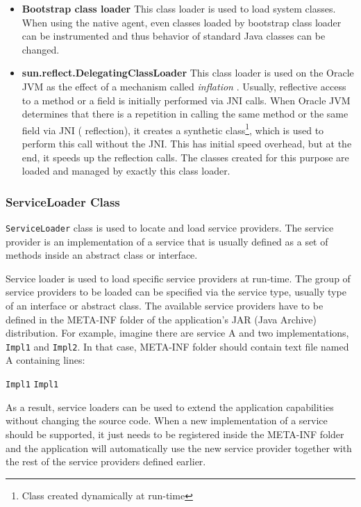 \begin{itemize}
	\item\textbf{Bootstrap class loader} \newline
	This class loader is used to load system classes. When using the native agent, even classes loaded by bootstrap class loader can be instrumented and thus behavior of standard Java classes can be changed.
	
	\item  \textbf{sun.reflect.DelegatingClassLoader} \newline
	This class loader is used on the Oracle JVM as the effect of a mechanism called \textit{inflation} \cite{inflation}. Usually, reflective access to a method or a field is initially performed via JNI calls. When Oracle JVM determines that there is a repetition in calling the same method or the same field via JNI ( reflection), it creates a synthetic class\footnote{Class created dynamically at run-time}, which is used to perform this call without the JNI. This has initial speed overhead, but at the end, it speeds up the reflection calls. The classes created for this purpose are loaded and managed by exactly this class loader. 
\end{itemize}
\subsubsection{ServiceLoader Class}
\texttt{ServiceLoader} class is used to locate and load service providers. The service provider is an implementation of a service that is usually defined as a set of methods inside an abstract class or interface. 

Service loader is used to load specific service providers at run-time. The group of service providers to be loaded can be specified via the service type, usually type of an interface or abstract class. The available service providers have to be defined in the META-INF folder of the application's JAR (Java Archive) distribution. For example, imagine there are service A and two implementations, \texttt{Impl1} and \texttt{Impl2}. In that case, META-INF folder should contain text file named A containing lines:
\begin{center}
\texttt{Impl1} \newline
\texttt{Impl1}  \newline
\end{center}
As a result, service loaders can be used to extend the application capabilities without changing the source code. When a new implementation of a service should be supported, it just needs to be registered inside the META-INF folder and the application will automatically use the new service provider together with the rest of the service providers defined earlier.
